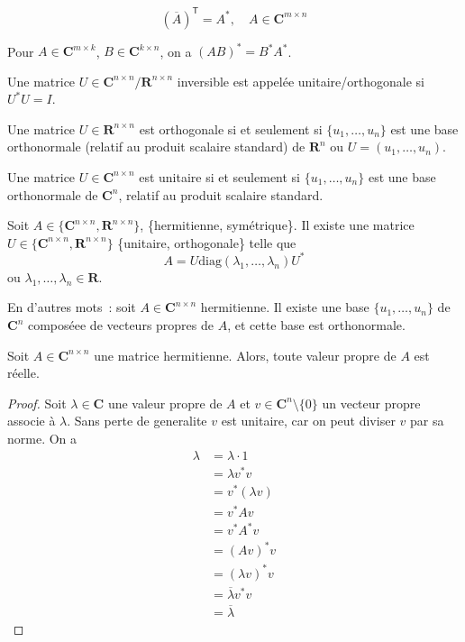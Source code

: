 
\begin{notation}
$$
(\overline{A})^{\mathsf{T}}=A^{*}, \quad A\in \mathbf{C}^{m\times n}
$$
\end{notation}
\begin{remark}
Pour $A\in \mathbf{C}^{m\times k}$, $B\in \mathbf{C}^{k\times n}$, on a $(AB)^{*}=B^{*}A^{*}$.
\end{remark}
\begin{definition}
Une matrice $U\in \mathbf{C}^{n\times n}/\mathbf{R}^{n\times n}$ inversible est appelée unitaire/orthogonale si $U^{*}U=I$. 
\end{definition}
\begin{remark}
Une matrice $U\in \mathbf{R}^{n\times n}$ est orthogonale si et seulement si $\{ u_{1},\dots,u_{n} \}$ est une base orthonormale (relatif au produit scalaire standard) de $\mathbf{R}^{n}$ ou $U=(u_{1},\dots,u_{n})$. 
\end{remark}
\begin{remark}
Une matrice $U\in \mathbf{C}^{n\times n}$ est unitaire si et seulement si $\{ u_{1},\dots,u_{n} \}$ est une base orthonormale de $\mathbf{C}^{n}$, relatif au produit scalaire standard.
\end{remark}
\begin{theorem}\label{specthm}
Soit $A\in \{ \mathbf{C}^{n\times n},\mathbf{R}^{n\times n} \}$, \{hermitienne, symétrique\}. Il existe une matrice $U\in \{ \mathbf{C}^{n\times n},\mathbf{R}^{n\times n} \}$ \{unitaire, orthogonale\} telle que 
$$
A=U\mathrm{diag}(\lambda_{1},\dots,\lambda _{n})U^{*}
$$
ou $\lambda_{1},\dots,\lambda _{n}\in \mathbf{R}$.
\end{theorem}
\begin{remark}
En d'autres mots : soit $A\in \mathbf{C}^{n\times n}$ hermitienne. Il existe une base $\{ u_{1},\dots,u_{n} \}$ de $\mathbf{C}^{n}$ composéee de vecteurs propres de $A$, et cette base est orthonormale.
\end{remark}
\begin{lemma}
Soit $A\in \mathbf{C}^{n\times n}$ une matrice hermitienne. Alors, toute valeur propre de $A$ est réelle.
\end{lemma}
\begin{proof}
Soit $\lambda \in \mathbf{C}$ une valeur propre de $A$ et $v\in \mathbf{C}^{n}\setminus \{ 0 \}$ un vecteur propre associe à $\lambda$. Sans perte de generalite $v$ est unitaire, car on peut diviser $v$ par sa norme. On a 
\begin{align*}
\lambda & =\lambda \cdot 1 \\
 & =\lambda v^{*}v \\
 & =v^{*}(\lambda v) \\
 & =v^{*}Av \\
 & =v^{*}A^{*}v  \\
 & =(Av)^{*}v  \\
 & =(\lambda v)^{*}v \\
 & =\overline{\lambda}v^{*}v \\
 &=\overline{\lambda}
\end{align*}
\end{proof}
